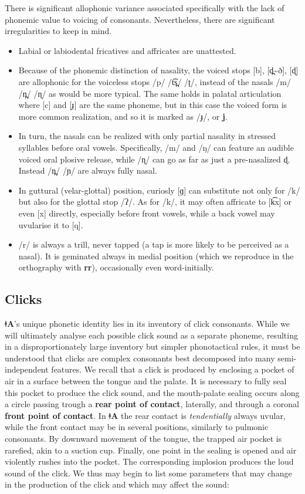 \documentclass[11pt,a5paper]{book}
\newcommand{\qcn}[1]{\textcolor{AccentText}{\large\textbf{#1}}}
\newcommand{\langname}{\qcn{ǂA}}
\begin{document}
There is significant allophonic variance associated specifically with the lack of phonemic value to voicing of consonants. Nevertheless, there are significant irregularities to keep in mind.

\begin{itemize}
	\item Labial or labiodental fricatives and affricates are unattested.
	\item Because of the phonemic distinction of nasality, the voiced stops [b], [d̪\textasciitilde{}ð], [ɖ] are allophonic for the voiceless stops /p/ /t͡s̪/ /ʈ/, instead of the nasals /m/ /n̪/ /ɳ/ as would be more typical. The same holds in palatal articulation where [c] and [ɟ] are the same phoneme, but in this case the voiced form is more common realization, and so it is marked as /ɟ/, or \qcn{j}.
	\item In turn, the nasals can be realized with only partial nasality in stressed syllables before oral vowels. Specifically, /m/ and /ŋ/ can feature an audible voiced oral plosive release, while /ɳ/ can go as far as just a pre-nasalized ɖ. Instead /n̪/ /ɲ/ are always fully nasal.
	\item In guttural (velar-glottal) position, curiosly [ɡ] can substitute not only for /k/ but also for the glottal stop /ʔ/. As for /k/, it may often affricate to [k͡x] or even [x] directly, especially before front vowels, while a back vowel may uvularise it to [q].
	\item /r/ is always a trill, never tapped (a tap is more likely to be perceived as a nasal). It is geminated always in medial position (which we reproduce in the orthography with \qcn{rr}), occasionally even word-initially.
\end{itemize}


\subsection{Clicks}

\langname's unique phonetic identity lies in its inventory of click consonants. While we will ultimately analyse each possible click sound as a separate phoneme, resulting in a disproportionately large inventory but simpler phonotactical rules, it must be understood that clicks are complex consonants best decomposed into many semi-independent features. We recall that a click is produced by enclosing a pocket of air in a surface between the tongue and the palate. It is necessary to fully seal this pocket to produce the click sound, and the mouth-palate sealing occurs along a circle passing trough a \textbf{rear point of contact}, laterally, and through a coronal \textbf{front point of contact}. In \langname{} the rear contact is \emph{tendentially} always uvular, while the front contact may be in several positions, similarly to pulmonic consonants. By downward movement of the tongue, the trapped air pocket is rarefied, akin to a suction cup. Finally, one point in the sealing is opened and air violently rushes into the pocket. The corresponding implosion produces the loud sound of the click. We thus may begin to list some parameters that may change in the production of the click and which may affect the sound:
\end{document}
